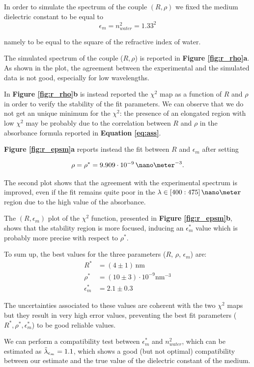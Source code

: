\documentclass[twocolumn]{article}
\begin{document}
\begin{multicols}{2}
In order to simulate the spectrum of the couple $(R,\rho)$ we fixed the medium dielectric constant to be equal to 
\[\epsilon_m=n_{water}^2=1.33^2\]

\noindent
namely to be equal to the square of the refractive index of water.

The simulated spectrum of the couple ($R,\rho$) is reported in \textbf{Figure \ref{fig:r_rho}a}. As shown in the plot, the agreement between the experimental and the simulated data is not good, especially for low wavelengths.

In \textbf{Figure \ref{fig:r_rho}b} is instead reported the $\chi^2$ map as a function of $R$ and $\rho$ in order to verify the stability of the fit parameters. We can observe that we do not get an unique minimum for the $\chi^2$: the presence of an elongated region with low $\chi^2$ may be probably due to the correlation between $R$ and $\rho$ in the absorbance formula reported in \textbf{Equation \ref{eq:ass}}.

\textbf{Figure \ref{fig:r_epsm}a} reports instead the fit between $R$ and $\epsilon_m$ after setting 

\[\rho = \rho^*=9.909\cdot10^{-9}\,\nano\meter^{-3}.\]

\noindent
The second plot shows that the agreement with the experimental spectrum is improved, even if the fit remains quite poor in the $\lambda \in [400:475]\, \nano\meter$ region due to the high value of the absorbance.

The \( (R,\epsilon_m) \) plot of the $\chi^2$ function, presented in \textbf{Figure \ref{fig:r_epsm}b}, shows that the stability region is more focused, inducing an $\epsilon_m^*$ value which is probably more precise with respect to $\rho^*$.

\noindent
To sum up, the best values for the three parameters ($R$, $\rho$, $\epsilon_m$) are:
\begin{align*}
    R^* &= (4\pm 1)\, \text{nm}\\
    \rho^* &= (10 \pm 3)\cdot 10^{-9} \text{nm}^{-3} \\
    \epsilon_m^* &= 2.1 \pm 0.3
\end{align*}

\noindent
The uncertainties associated to these values are coherent with the two $\chi^2$ maps but they result in very high error values, preventing the best fit parameters ($R^*, \rho^*, \epsilon_m^*$) to be good reliable values. 

We can perform a compatibility test between $\epsilon_m^*$ and $n_{water}^2$, which can be estimated as $\Tilde{\lambda}_{\epsilon_m}=1.1$, which shows a good (but not optimal) compatibility between our estimate and the true value of the dielectric constant of the medium.


\end{multicols}
\end{document}
